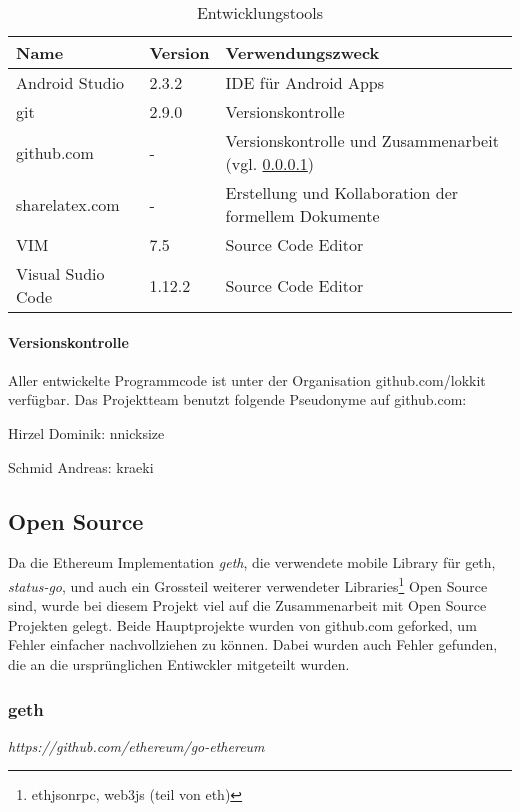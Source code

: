 \begin{table}[H]
\centering
\caption{Entwicklungstools}
\label{tbl:Entwicklungstools}
\begin{tabular}{@{}L{3cm}R{1cm}L{10cm}@{}}
\toprule
Name & Version & Verwendungszweck \\\midrule
Android Studio & 2.3.2 & IDE für Android Apps\\ \midrule
git & 2.9.0 & Versionskontrolle \\ \midrule
github.com & - & Versionskontrolle und Zusammenarbeit (vgl. \ref{para:Versionskontrolle}) \\ \midrule
sharelatex.com & - & Erstellung und Kollaboration der formellem Dokumente\\ \midrule
VIM & 7.5 & Source Code Editor \\ \midrule
Visual Sudio Code & 1.12.2 & Source Code Editor \\ \bottomrule
\end{tabular}
\end{table}

\paragraph{Versionskontrolle}
\label{para:Versionskontrolle}
Aller entwickelte Programmcode ist unter der Organisation github.com/lokkit verfügbar. Das Projektteam benutzt folgende Pseudonyme auf github.com:

Hirzel Dominik: nnicksize

Schmid Andreas: kraeki


\subsection{Open Source}
\label{subsec:Open_Source}
Da die Ethereum Implementation \emph{geth}, die verwendete mobile Library für geth, \emph{status-go}, und auch ein Grossteil weiterer verwendeter Libraries\footnote{ethjsonrpc, web3js (teil von eth)} Open Source sind, wurde bei diesem Projekt viel auf die Zusammenarbeit mit Open Source Projekten gelegt. Beide Hauptprojekte wurden von github.com geforked, um Fehler einfacher nachvollziehen zu können. Dabei wurden auch Fehler gefunden, die an die ursprünglichen Entiwckler mitgeteilt wurden.

\subsubsection{geth}
\emph{https://github.com/ethereum/go-ethereum}

